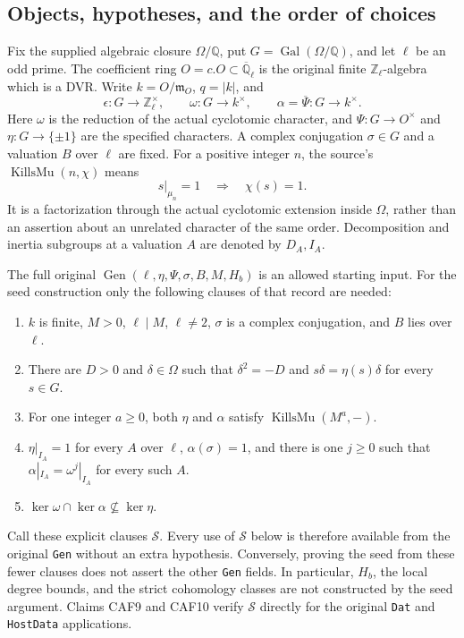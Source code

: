 \documentclass[11pt,a4paper]{article}
\numberwithin{equation}{section}
\theoremstyle{remark}\newtheorem{remark}[theorem]{Remark}
\begin{document}
\subsection{Objects, hypotheses, and the order of choices}

Fix the supplied algebraic closure \(\Omega/\mathbb Q\), put
\(G=\operatorname{Gal}(\Omega/\mathbb Q)\), and let \(\ell\) be an
odd prime.  The coefficient ring \(O=c.O\subset\overline{\mathbb Q}_\ell\)
is the original finite \(\mathbb Z_\ell\)-algebra which is a DVR.
Write \(k=O/\mathfrak m_O\), \(q=|k|\), and
\[
 \epsilon:G\longrightarrow\mathbb Z_\ell^\times,\qquad
 \omega:G\longrightarrow k^\times,
 \qquad \alpha=\overline\Psi:G\longrightarrow k^\times .
 \tag{CAF.1}
\]
Here \(\omega\) is the reduction of the actual cyclotomic character,
and \(\Psi:G\to O^\times\) and
\(\eta:G\to\{\pm1\}\) are the specified characters.  A complex
conjugation \(\sigma\in G\) and a valuation \(B\) over \(\ell\)
are fixed.  For a positive integer \(n\), the source's
\(\operatorname{KillsMu}(n,\chi)\) means
\[
 s|_{\mu_n}=1\quad\Longrightarrow\quad \chi(s)=1.
 \tag{CAF.2}
\]
It is a factorization through the actual cyclotomic extension inside
\(\Omega\), rather than an assertion about an unrelated character of
the same order.  Decomposition and inertia subgroups at a valuation
\(A\) are denoted by \(D_A,I_A\).

The full original \(\operatorname{Gen}(\ell,\eta,\Psi,\sigma,B,M,H_b)\)
is an allowed starting input.  For the seed construction only the
following clauses of that record are needed:
\begin{enumerate}
\item \(k\) is finite, \(M>0\), \(\ell\mid M\), \(\ell\ne2\),
      \(\sigma\) is a complex conjugation, and \(B\) lies over \(\ell\).
\item There are \(D>0\) and \(\delta\in\Omega\) such that
      \(\delta^2=-D\) and \(s\delta=\eta(s)\delta\) for every \(s\in G\).
\item For one integer \(a\ge0\), both \(\eta\) and \(\alpha\)
      satisfy \(\operatorname{KillsMu}(M^a,-)\).
\item \(\eta|_{I_A}=1\) for every \(A\) over \(\ell\),
      \(\alpha(\sigma)=1\), and there is one \(j\ge0\) such that
      \(\alpha|_{I_A}=\omega^j|_{I_A}\) for every such \(A\).
\item \(\ker\omega\cap\ker\alpha\not\subseteq\ker\eta\).
\end{enumerate}
Call these explicit clauses \(\mathcal S\).  Every use of
\(\mathcal S\) below is therefore available from the original
\texttt{Gen} without an extra hypothesis.  Conversely, proving the
seed from these fewer clauses does not assert the other
\texttt{Gen} fields.  In particular, \(H_b\), the local degree bounds,
and the strict cohomology classes are not constructed by the seed
argument.  Claims CAF9 and CAF10 verify \(\mathcal S\) directly for
the original \texttt{Dat} and \texttt{Host\allowbreak Data} applications.
\end{document}
